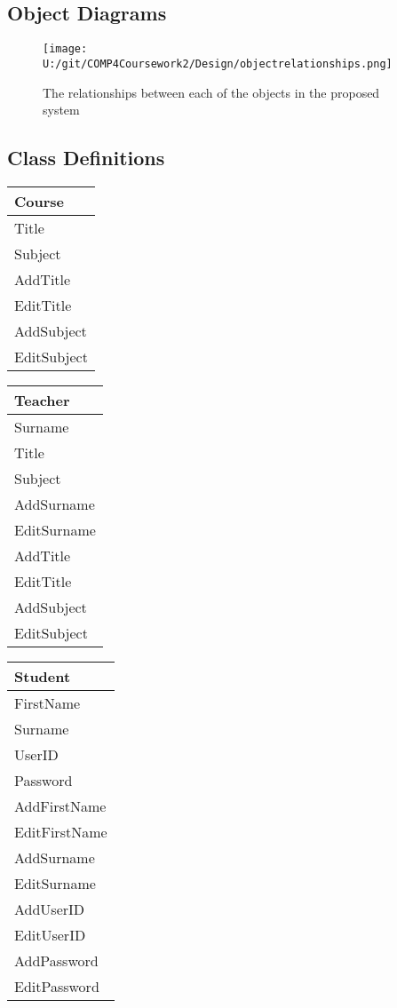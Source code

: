 \subsection{Object Diagrams}

\begin{figure}[H]
    \texttt{[image: U:/git/COMP4Coursework2/Design/objectrelationships.png]}
    \caption{The relationships between each of the objects in the proposed system} \label{fig:print_function_result}
\end{figure}

\subsection{Class Definitions}

\begin{center}
\begin{tabular}{|p{5cm}|} \hline
Course \\ \hline
Title \\
Subject \\ \hline
AddTitle \\ 
EditTitle \\
AddSubject \\
EditSubject \\ \hline
\end{tabular}
\end{center}

\begin{center}
\begin{tabular}{|p{5cm}|} \hline
Teacher \\ \hline
Surname \\
Title \\
Subject \\ \hline
AddSurname \\
EditSurname \\
AddTitle \\
EditTitle \\
AddSubject \\
EditSubject \\ \hline
\end{tabular}
\end{center}

\begin{center}
\begin{tabular}{|p{5cm}|} \hline
Student \\ \hline
FirstName \\
Surname \\
UserID \\
Password  \\ \hline
AddFirstName \\
EditFirstName \\
AddSurname \\
EditSurname \\
AddUserID \\
EditUserID \\
AddPassword \\
EditPassword \\ \hline
\end{tabular}
\end{center}

